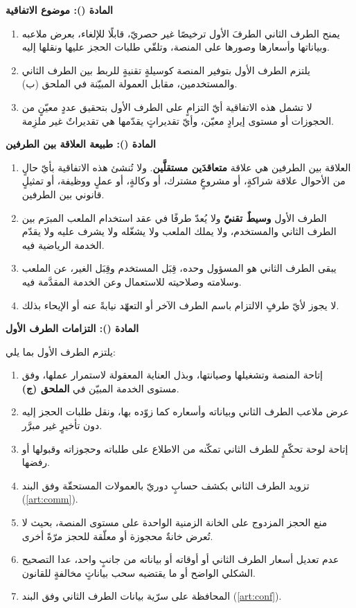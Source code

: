 \documentclass[12pt,a4paper]{article}
\newcounter{bndc}
\newcommand{\bnd}[1]{%
  \vspace{10pt}\par\noindent
  {\color{teal}\bfseries\large المادة (\arabic{bndc}): #1}%
  \stepcounter{bndc}%
  \par\vspace{2pt}\noindent{\color{rule}\rule{\linewidth}{0.6pt}}\par\vspace{4pt}%
}
\newcommand{\mlh}[1]{{\bfseries #1}}
\newenvironment{bnditems}
  {\begin{enumerate}[label=\arabic{bndc}.\arabic*,leftmargin=1.6em,itemsep=3pt,topsep=3pt]}
  {\end{enumerate}}
\begin{document}
\bnd{موضوع الاتفاقية}
\begin{bnditems}
  \item يمنح الطرف الثاني الطرفَ الأول ترخيصًا غير حصريّ، قابلًا للإلغاء، بعرض ملاعبه وبياناتها وأسعارها وصورها على المنصة، وتلقّي طلبات الحجز عليها ونقلها إليه.
  \item يلتزم الطرف الأول بتوفير المنصة كوسيلةٍ تقنيةٍ للربط بين الطرف الثاني والمستخدمين، مقابل العمولة المبيّنة في الملحق (ب).
  \item لا تشمل هذه الاتفاقية أيّ التزامٍ على الطرف الأول بتحقيق عددٍ معيّنٍ من الحجوزات أو مستوى إيرادٍ معيّن، وأيّ تقديراتٍ يقدّمها هي تقديراتٌ غير ملزِمة.
\end{bnditems}

\bnd{طبيعة العلاقة بين الطرفين}\label{art:nature}
\begin{bnditems}
  \item العلاقة بين الطرفين هي علاقة \mlh{متعاقدَين مستقلَّين}. ولا تُنشئ هذه الاتفاقية بأيّ حالٍ من الأحوال علاقة شراكةٍ، أو مشروعٍ مشترك، أو وكالةٍ، أو عملٍ ووظيفة، أو تمثيلٍ قانوني بين الطرفين.
  \item الطرف الأول \mlh{وسيطٌ تقنيّ} ولا يُعدّ طرفًا في عقد استخدام الملعب المبرَم بين الطرف الثاني والمستخدم، ولا يملك الملعب ولا يشغّله ولا يشرف عليه ولا يقدّم الخدمة الرياضية فيه.
  \item يبقى الطرف الثاني هو المسؤول وحده، قِبَل المستخدم وقِبَل الغير، عن الملعب وسلامته وصلاحيته للاستعمال وعن الخدمة المقدَّمة فيه.
  \item لا يجوز لأيّ طرفٍ الالتزام باسم الطرف الآخر أو التعهّد نيابةً عنه أو الإيحاء بذلك.
\end{bnditems}

\bnd{التزامات الطرف الأول}
يلتزم الطرف الأول بما يلي:
\begin{bnditems}
  \item إتاحة المنصة وتشغيلها وصيانتها، وبذل العناية المعقولة لاستمرار عملها، وفق مستوى الخدمة المبيّن في \mlh{الملحق (ج)}.
  \item عرض ملاعب الطرف الثاني وبياناته وأسعاره كما زوّده بها، ونقل طلبات الحجز إليه دون تأخيرٍ غير مبرَّر.
  \item إتاحة لوحة تحكّمٍ للطرف الثاني تمكّنه من الاطلاع على طلباته وحجوزاته وقبولها أو رفضها.
  \item تزويد الطرف الثاني بكشف حسابٍ دوريّ بالعمولات المستحقّة وفق البند (\ref{art:comm}).
  \item منع الحجز المزدوج على الخانة الزمنية الواحدة على مستوى المنصة، بحيث لا تُعرض خانةٌ محجوزة أو معلّقة للحجز مرّةً أخرى.
  \item عدم تعديل أسعار الطرف الثاني أو أوقاته أو بياناته من جانبٍ واحد، عدا التصحيح الشكلي الواضح أو ما يقتضيه سحب بياناتٍ مخالفةٍ للقانون.
  \item المحافظة على سرّية بيانات الطرف الثاني وفق البند (\ref{art:conf}).
\end{bnditems}
\end{document}
